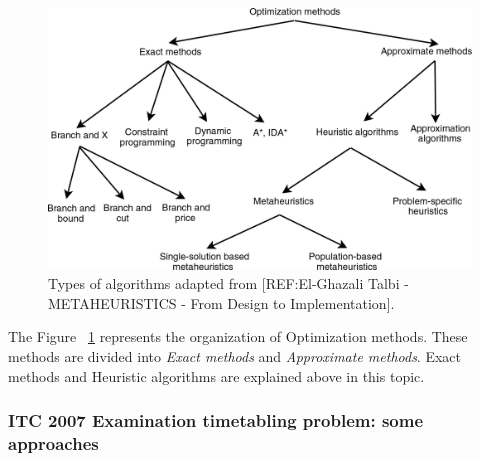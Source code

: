 \begin{figure}[h!]
 \centering
   \includegraphics{./images/types_of_algorithms.png}
   \caption{Types of algorithms adapted from [REF:El-Ghazali Talbi - METAHEURISTICS - From Design to Implementation].}
   \label{fig:TypesAlgorithms}
\end{figure}

The Figure ~\ref{fig:TypesAlgorithms} represents the organization of Optimization methods. These methods are divided into \textit{Exact methods} and \textit{Approximate methods}. Exact methods and Heuristic algorithms are explained above in this topic.

\subsubsection{ITC 2007 Examination timetabling problem: some approaches}
\label{subsection:ApprITC2007}

